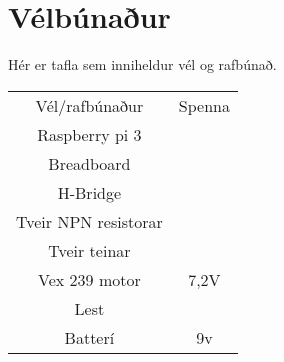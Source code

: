 \section{Vélbúnaður}
Hér er tafla sem inniheldur vél og rafbúnað.

\begin{center}
\begin{tabular}{ |c|c| } 
 \hline
 Vél/rafbúnaður &Spenna \\ 
 Raspberry pi 3 \cite{monk2015programming} &\\ 
 Breadboard & \\
 H-Bridge \cite{kanai2011h} & \\
 Tveir NPN resistorar & \\
 Tveir teinar & \\
 Vex 239 motor & 7,2V \\
 Lest & \\
 Batterí & 9v \\
 \hline
\end{tabular}
\end{center}